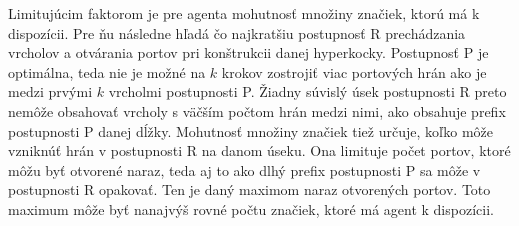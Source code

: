 Limitujúcim faktorom je pre agenta mohutnosť množiny značiek, ktorú má k
dispozícii. Pre ňu následne hľadá čo najkratšiu postupnosť R prechádzania
vrcholov a otvárania portov pri konštrukcii danej hyperkocky. Postupnosť P
je optimálna, teda nie je možné na $k$ krokov zostrojiť viac
portových hrán ako je medzi prvými $k$ vrcholmi postupnosti P. Žiadny
súvislý úsek postupnosti R preto nemôže obsahovať vrcholy s väčším počtom
hrán medzi nimi, ako obsahuje prefix postupnosti P danej dĺžky.
Mohutnosť množiny značiek tiež určuje, koľko môže vzniknúť hrán v
postupnosti R na danom úseku. Ona limituje počet portov, ktoré môžu byť 
otvorené
naraz, teda aj to ako dlhý prefix postupnosti P sa môže v postupnosti R
opakovať. Ten je daný maximom naraz otvorených portov. Toto maximum môže byť
nanajvýš rovné počtu značiek, ktoré má agent k dispozícii.



